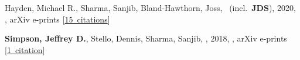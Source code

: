 \item[{\color{numcolor}\scriptsize2}] Hayden, Michael R., Sharma, Sanjib, Bland-Hawthorn, Joss, \etal\ (incl.\ \textbf{JDS}), 2020, , arXiv e-prints [\href{https://ui.adsabs.harvard.edu/#abs/2020arXiv201113745H}{15~citations}]

\item[{\color{numcolor}\scriptsize1}] \textbf{Simpson, Jeffrey D.}, Stello, Dennis, Sharma, Sanjib, \etal, 2018, , arXiv e-prints [\href{https://ui.adsabs.harvard.edu/#abs/2018arXiv180405900S}{1~citation}]